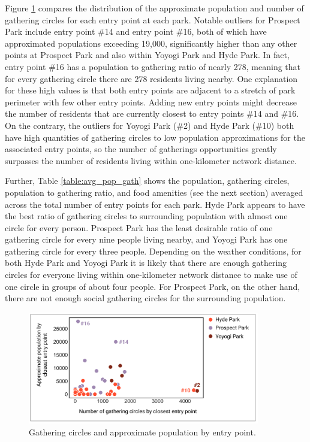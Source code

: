 \begin{multicols}{2}
Figure \ref{fig:scatter_gath_pop} compares the distribution of the approximate population and number of gathering circles for each entry point at each park. Notable outliers for Prospect Park include entry point \#14 and entry point \#16, both of which have approximated populations exceeding 19,000, significantly higher than any other points at Prospect Park and also within Yoyogi Park and Hyde Park. In fact, entry point \#16 has a population to gathering ratio of nearly 278, meaning that for every gathering circle there are 278 residents living nearby. One explanation for these high values is that both entry points are adjacent to a stretch of park perimeter with few other entry points. Adding new entry points might decrease the number of residents that are currently closest to entry points \#14 and \#16. On the contrary, the outliers for Yoyogi Park (\#2) and Hyde Park (\#10) both have high quantities of gathering circles to low population approximations for the associated entry points, so the number of gatherings opportunities greatly surpasses the number of residents living within one-kilometer network distance. 

Further, Table \ref{table:avg_pop_gath} shows the population, gathering circles, population to gathering ratio, and food amenities (see the next section) averaged across the total number of entry points for each park. Hyde Park appears to have the best ratio of gathering circles to surrounding population with almost one circle for every person. Prospect Park has the least desirable ratio of one gathering circle for every nine people living nearby, and Yoyogi Park has one gathering circle for every three people. Depending on the weather conditions, for both Hyde Park and Yoyogi Park it is likely that there are enough gathering circles for everyone living within one-kilometer network distance to make use of one circle in groups of about four people. For Prospect Park, on the other hand, there are not enough social gathering circles for the surrounding population.

\end{multicols}

\begin{figure}[H]
  \centering
  \vspace{8pt}
  \includegraphics[width=0.9\textwidth]{images/network/scatter_pop_gath.png}
  \captionsetup{width=0.9\linewidth}
  \caption[Scatter plot]{Gathering circles and approximate population by entry point.}
  \label{fig:scatter_gath_pop}
\end{figure}\par

